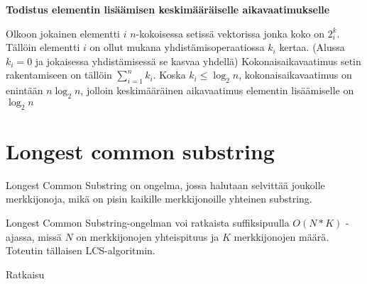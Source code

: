 \documentclass{article}
\begin{document}
    \textbf{Todistus elementin lisäämisen keskimääräiselle aikavaatimukselle}

    Olkoon jokainen elementti $i$ $n$-kokoisessa setissä vektorissa jonka koko on $2^k_i$. Tällöin elementti $i$ on ollut mukana
    yhdistämisoperaatiossa $k_i$ kertaa. (Alussa $k_i=0$ ja jokaisessa yhdistämisessä se kasvaa yhdellä) Kokonaisaikavaatimus 
    setin rakentamiseen on tällöin $\sum_{i=1}^n{k_i}$. Koska $k_i\leq \log_2n$, kokonaisaikavaatimus on enintään
    $n\log_2n$, jolloin keskimääräinen aikavaatimus elementin lisäämiselle on $\log_2 n$

  \section{Longest common substring}
    Longest Common Substring on ongelma, jossa halutaan selvittää joukolle merkkijonoja, mikä on pisin kaikille merkkijonoille
    yhteinen substring.
    
    Longest Common Substring-ongelman voi ratkaista suffiksipuulla $O(N*K)$ -ajassa, missä $N$ on merkkijonojen yhteispituus ja
    $K$ merkkijonojen määrä. Toteutin tällaisen LCS-algoritmin.
    
    Ratkaisu
\end{document}
